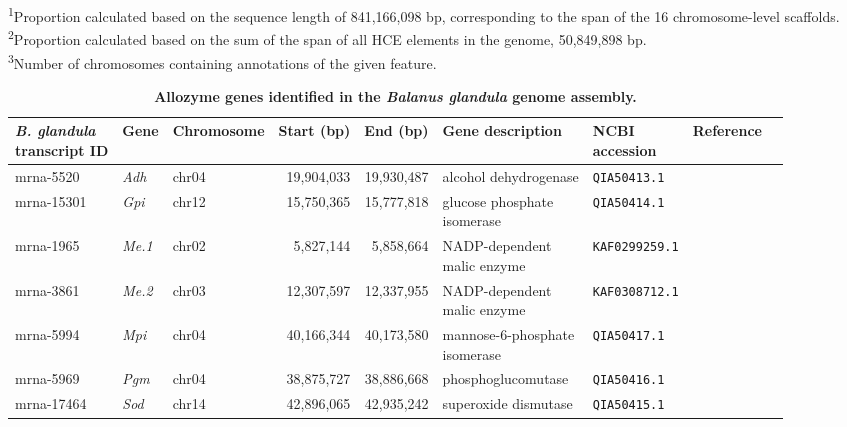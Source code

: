 \documentclass[11pt]{article}
\newcounter{suptable}
\newcommand{\suptablecaption}[1]{%
    \addtocounter{table}{-1}%
    \refstepcounter{suptable}%
    \renewcommand{\thetable}{S\arabic{suptable}}%
    \caption{#1}%
    \addtocounter{table}{1}%
    \renewcommand{\thetable}{\arabic{table}}%
}
\newcommand{\balgla}{\textit{Balanus glandula}\xspace}
\newcommand{\bgla}{\textit{B. glandula}\xspace}
\begin{document}
\begin{table}
\textsuperscript{1}Proportion calculated based on the sequence length of 841,166,098
    bp, corresponding to the span of the 16 chromosome-level scaffolds.\\
\textsuperscript{2}Proportion calculated based on the sum of the span of all HCE
    elements in the genome, 50,849,898 bp. \\
\textsuperscript{3}Number of chromosomes containing annotations of the given
    feature.
\end{table}

\begin{table}
    \centering
    \suptablecaption{\textbf{Allozyme genes identified in the \balgla{}
        genome assembly.}}
    \begin{tabular}{lllrrllll}
        \toprule
        \shortstack{\bgla{} \\ transcript ID} &
            Gene &
            Chromosome &
            Start (bp) &
            End (bp) & 
            Gene description &
            \shortstack{NCBI \\ accession} &
            Reference \\
        \midrule
        mrna-5520 & \textit{Adh} & chr04 & 19,904,033 & 19,930,487 &
            alcohol dehydrogenase &
            \texttt{QIA50413.1} & \cite{nunez_footprints_2020} \\
        mrna-15301 & \textit{Gpi} & chr12 & 15,750,365 & 15,777,818 &
            \shortstack[l]{glucose phosphate \\ isomerase} &
            \texttt{QIA50414.1} & \cite{nunez_footprints_2020} \\
        mrna-1965 & \textit{Me.1} & chr02 & 5,827,144 & 5,858,664 &
            \shortstack[l]{NADP-dependent \\ malic enzyme} &
            \texttt{KAF0299259.1} & \cite{kim_draft_2019} \\
        mrna-3861 & \textit{Me.2} & chr03 & 12,307,597 & 12,337,955 &
            \shortstack[l]{NADP-dependent \\ malic enzyme} &
            \texttt{KAF0308712.1} & \cite{kim_draft_2019} \\
        mrna-5994 & \textit{Mpi} & chr04 & 40,166,344 & 40,173,580 &
            \shortstack[l]{mannose-6-phosphate \\ isomerase} &
            \texttt{QIA50417.1} & \cite{nunez_footprints_2020} \\
        mrna-5969 & \textit{Pgm} & chr04 & 38,875,727 & 38,886,668 &
            phosphoglucomutase &
            \texttt{QIA50416.1} & \cite{nunez_footprints_2020} \\
        mrna-17464 & \textit{Sod} & chr14 & 42,896,065 & 42,935,242 &
            superoxide dismutase &
            \texttt{QIA50415.1} & \cite{nunez_footprints_2020} \\

        \bottomrule
    \end{tabular}
    \label{tab:sup_allozymes}
\end{table}
\end{document}
